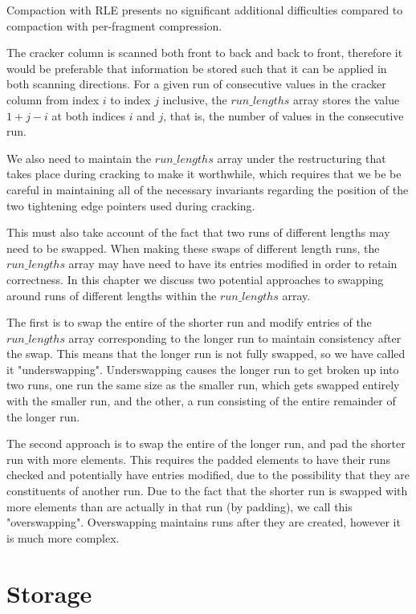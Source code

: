 Compaction with RLE presents no significant additional difficulties compared to compaction with per-fragment compression. 

The cracker column is scanned both front to back and back to front, therefore it would be preferable
that information be stored such that it can be applied in both scanning directions. For a given run of consecutive values in the cracker column from index $i$ to index $j$ inclusive, the $run\_lengths$ array stores the value $1 + j - i$ at both indices $i$ and $j$, that is, the number of values in the consecutive run.

We also need to maintain the $run\_lengths$ array under the restructuring that takes place during
cracking to make it worthwhile, which requires that we be be careful in maintaining all of the
necessary invariants regarding the position of the two tightening edge pointers used during cracking.

This must also take account of the fact that two runs of different lengths may need to be swapped. When making these swaps of different length runs, the $run\_lengths$ array may have need to have its entries modified in order to retain correctness. In this chapter we discuss two potential approaches to swapping around runs of different lengths within the $run\_lengths$ array.

The first is to swap the entire of the shorter run and modify entries of the $run\_lengths$ array
corresponding to the longer run to maintain consistency after the swap. This means that the longer
run is not fully swapped, so we have called it "underswapping". Underswapping causes the longer run
to get broken up into two runs, one run the same size as the smaller run, which gets swapped entirely with the smaller run, and the other, a run consisting of the entire remainder of the longer run.

The second approach is to swap the entire of the longer run, and pad the shorter run with more elements. This requires the padded elements to have their runs checked and potentially have entries modified, due to the possibility that they are constituents of another run. Due to the fact that the shorter run is swapped with more elements than are actually in that run (by padding), we call this "overswapping". Overswapping maintains runs after they are created, however it is much more complex.

\section{Storage}

